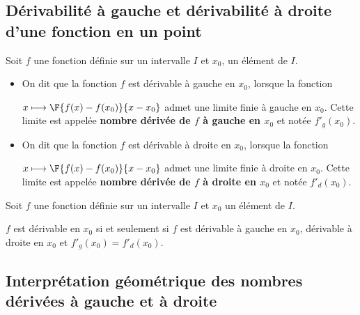 \subsection{Dérivabilité à gauche et dérivabilité à droite d'une fonction en un point}
\begin{definition}[s]
Soit $f$ une fonction définie sur un intervalle $I$ et $x_0$, 
un élément de $I$.
\begin{itemize}
	\item On dit que la fonction $f$ est dérivable à gauche en $x_0$, lorsque la fonction 
	\par $x\longmapsto \F{f(x)-f(x_0)}{x-x_0}$ admet une limite finie à gauche en $x_0$. Cette limite est appelée \textbf{nombre dérivée de $f$ à gauche en $x_0$} et notée $f'_g(x_0)$.
		\item On dit que la fonction $f$ est dérivable à droite en $x_0$, lorsque la fonction 
		\par $x\longmapsto \F{f(x)-f(x_0)}{x-x_0}$ admet une limite finie à droite en $x_0$. Cette limite est appelée \textbf{nombre dérivée de $f$ à droite en $x_0$} et notée $f'_d(x_0)$.
\end{itemize}
\end{definition}
\hspace*{-0.8cm}
\begin{propriete}
	Soit $f$ une fonction définie sur un intervalle $I$ et $x_0$
	un élément de $I$.
	\par $f$ est dérivable en $x_0$ si et seulement si $f$ est dérivable à gauche en $x_0$, dérivable à droite en $x_0$ et $f'_g(x_0)=f'_d(x_0)$.
\end{propriete}
\subsection{Interprétation géométrique des nombres dérivées à gauche et à droite}
\vspace*{-0.7cm}

